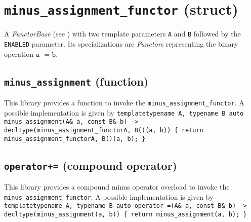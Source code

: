 
\section{\texttt{minus\_assignment\_functor} (struct)}
A \textit{FunctorBase} (see \cite{functors}) with two template parameters \texttt{A} and \texttt{B} followed by the \texttt{ENABLED} parameter.
Its specializations are \textit{Functor}s representing the binary operation $\texttt{a -= b}$.

\subsection{\texttt{minus\_assignment} (function)}
This library provides a function to invoke the \texttt{minus\_assignment\_functor}.
A possible implementation is given by\newline
\texttt{template\textlangle typename A, typename B\textrangle\newline
auto\newline
minus\_assignment(A\& a, const B\& b)\newline
-> decltype(minus\_assignment\_functor\textlangle A, B\textrangle()(a, b))\newline
\{ return minus\_assignment\_functor\textlangle A, B\textrangle()(a, b); \}}

\subsection{\texttt{operator+=} (compound operator)}
This library provides a compound minus operator overload to invoke the \texttt{minus\_assignment\_functor}.
A possible implementation is given by\newline
\texttt{template\textlangle typename A, typename B\textrangle\newline
auto\newline
operator-=(A\& a, const B\& b)\newline
-> decltype(minus\_assignment(a, b))\newline
\{ return minus\_assignment(a, b); \}}
